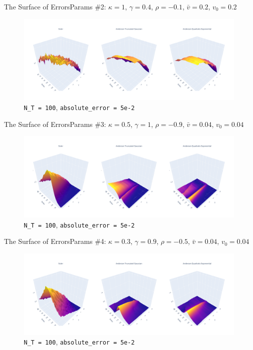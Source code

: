 \begin{frame}{The Surface of Errors}{Params \#2: $\kappa = 1$, $\gamma = 0.4$, $\rho = -0.1$, $\bar v = 0.2$, $v_0 = 0.2$}
    \begin{figure}
        \includegraphics[width=\textwidth]{part4/pictures/err_surface_strike_T_N_T=100_param2.pdf}
        \caption{\texttt{N\_T = 100}, \texttt{absolute\_error = 5e-2}}
    \end{figure}
\end{frame}

\begin{frame}{The Surface of Errors}{Params \#3: $\kappa = 0.5$, $\gamma = 1$, $\rho = -0.9$, $\bar v = 0.04$, $v_0 = 0.04$}
    \begin{figure}
        \includegraphics[width=\textwidth]{part4/pictures/err_surface_strike_T_N_T=100_param3.pdf}
        \caption{\texttt{N\_T = 100}, \texttt{absolute\_error = 5e-2}}
    \end{figure}
\end{frame}

\begin{frame}{The Surface of Errors}{Params \#4: $\kappa = 0.3$, $\gamma = 0.9$, $\rho = -0.5$, $\bar v = 0.04$, $v_0 = 0.04$}
    \begin{figure}
        \includegraphics[width=\textwidth]{part4/pictures/err_surface_strike_T_N_T=100_param4.pdf}
        \caption{\texttt{N\_T = 100}, \texttt{absolute\_error = 5e-2}}
    \end{figure}
\end{frame}

